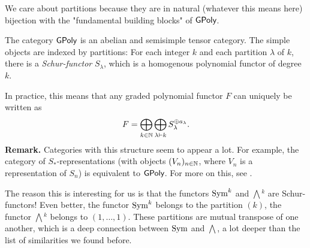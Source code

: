 \documentclass[../main.tex]{subfiles}
\begin{document}
We care about partitions because they are in natural (whatever this means here)
bijection with the "fundamental building blocks" of $\textnormal{$\textsf{GPoly}$}$.

\begin{thm}
    The category $\textnormal{$\textsf{GPoly}$}$ is an abelian and semisimple tensor category. The
    simple objects are indexed
    by partitions: For each integer $k$ and each partition $\lambda$ of $k$, there 
    is a \emph{Schur-functor} $S_\lambda$, which is a homogenous polynomial functor
    of degree $k$.
\end{thm}
In practice, this means that any graded polynomial functor $F$ can uniquely be written as
\begin{equation*}
    F = \bigoplus_{k \in \mathbb{N}} \bigoplus_{\lambda \vdash k} S_\lambda^{\oplus a_\lambda}.
\end{equation*}
\textbf{Remark.} Categories with this structure seem to appear a lot. For
example, the category of $S_*$-representations (with objects $(V_n)_{n \in \mathbb{N}}$, where
$V_n$ is a representation of $S_n$) is equivalent to $\textnormal{$\textsf{GPoly}$}$. For more on this,
see \cite{sam2012introduction}.

The reason this is interesting for us is that the functors $\operatorname{Sym}^k$ and
$\bigwedge{}^k$ are Schur-functors! 
Even better, the functor $\operatorname{Sym}^k$ belongs to the partition $(k)$, the functor
$\bigwedge{}^k$ belongs to $(1,\dots, 1)$. These partitions are mutual transpose 
of one another, which is a deep connection between $\operatorname{Sym}$ and $\bigwedge$, a lot 
deeper than the list of similarities we found before.
\end{document}

